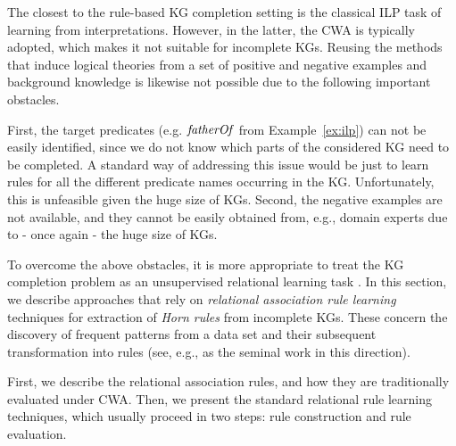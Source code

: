 The closest to the rule-based KG completion setting is the classical ILP task of learning from interpretations. However, in the latter, the CWA is typically adopted, which makes it not suitable for incomplete KGs. Reusing the methods that induce logical theories from a set of positive and negative examples and background knowledge is likewise not possible due to the following important obstacles. %

First, the target predicates (e.g. $\mathit{fatherOf}$ from Example~\ref{ex:ilp}) can
not be easily identified, since we do not know which parts of the considered KG need to
 be completed. A standard way of addressing this issue would be just to learn rules for all
 the different predicate names occurring in the KG. Unfortunately, this is unfeasible
 given the huge size of KGs. Second, the negative examples are not available,
 and they cannot be easily obtained from, e.g., domain experts due to - once again
 - the huge size of KGs. %

To overcome the above obstacles, it %
is more appropriate to treat the KG completion problem as an unsupervised relational learning task \cite{amie}.
In this section, we describe approaches that rely on \emph{relational association rule learning} techniques for extraction of \emph{Horn rules} from incomplete KGs. 
These concern the discovery of frequent patterns from a data set and their subsequent transformation into rules
(see, e.g., \cite{DBLP:conf/ilp/DehaspeR97} as the seminal work in this direction). %

First, we describe the relational association rules, and how they are traditionally evaluated under CWA. Then, we present the standard relational rule learning techniques, which usually proceed in two 
steps: rule construction and rule evaluation. %


